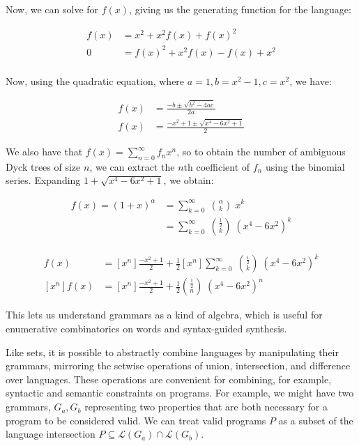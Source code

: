 \noindent Now, we can solve for $f(x)$, giving us the generating function for the language:

\begin{align*}
  f(x) &= x^2 + x^2 f(x) + f(x)^2\\
  0 &= f(x)^2 + x^2 f(x) - f(x) + x^2\\
\end{align*}

\noindent Now, using the quadratic equation, where $a = 1, b = x^2 - 1, c = x^2$, we have:

\begin{align*}
  f(x) &= \frac{-b \pm \sqrt{b^2 - 4ac}}{2a} \\
  f(x) &= \frac{-x^2 + 1 \pm \sqrt{x^4 - 6x^2 + 1}}{2}
\end{align*}

\noindent We also have that $f(x)=\sum _{n=0}^{\infty }f_nx^{n}$, so to obtain the number of ambiguous Dyck trees of size $n$, we can extract the $n$th coefficient of $f_n$ using the binomial series. Expanding $1 + \sqrt{x^4 - 6x^2 + 1}$, we obtain:

\begin{align*}
f(x) = (1+x)^{\alpha }&=\sum _{k=0}^{\infty }\;{\binom {\alpha }{k}}\;x^{k}\\
  &=\sum _{k=0}^{\infty }\;{\binom {\frac{1}{2} }{k}}\;(x^4 - 6x^2)^{k}\\
\end{align*}

\begin{align*}
  [x^n]f(x) &= [x^n]\frac{-x^2 + 1}{2} + \frac{1}{2}[x^n]\sum _{k=0}^{\infty }\;{\binom {\frac{1}{2} }{k}}\;(x^4 - 6x^2)^{k}\\
  [x^n]f(x) &= [x^n]\frac{-x^2 + 1}{2} + \frac{1}{2}{\binom {\frac{1}{2} }{n}}\;(x^4 - 6x^2)^n
\end{align*}

This lets us understand grammars as a kind of algebra, which is useful for enumerative combinatorics on words and syntax-guided synthesis.



Like sets, it is possible to abstractly combine languages by manipulating their grammars, mirroring the setwise operations of union, intersection, and difference over languages. These operations are convenient for combining, for example, syntactic and semantic constraints on programs. For example, we might have two grammars, $G_a, G_b$ representing two properties that are both necessary for a program to be considered valid. We can treat valid programs $P$ as a subset of the language intersection $P \subseteq \mathcal{L}(G_a) \cap \mathcal{L}(G_b)$.

